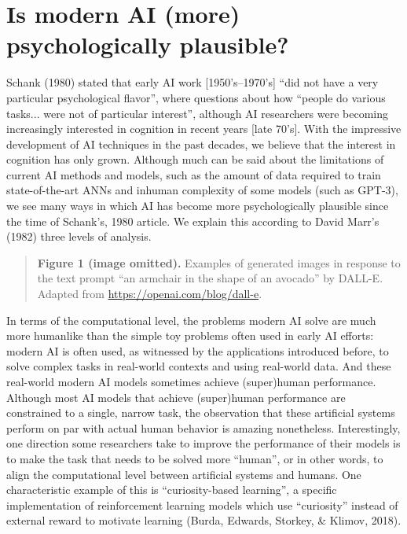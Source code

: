 \section{Is modern AI (more) psychologically plausible?}

Schank (1980) stated that early AI work [1950's--1970's]
``did not have a very particular psychological flavor'', where
questions about how ``people do various tasks... were not of
particular interest'', although AI researchers were becoming
increasingly interested in cognition in recent years [late 70's].
With the impressive development of AI techniques in the past decades,
we believe that the interest in cognition has only grown.
Although much can be said about the limitations of current AI methods
and models, such as the amount of data required to train state-of-the-art
ANNs and inhuman complexity of some models (such as GPT-3), we see many
ways in which AI has become more psychologically plausible since the
time of Schank's, 1980 article.
We explain this according to David Marr's (1982) three levels of analysis.

\begin{quote}
\small
\textbf{Figure 1 (image omitted).}
Examples of generated images in response to the text prompt
``an armchair in the shape of an avocado'' by DALL-E.
Adapted from \url{https://openai.com/blog/dall-e}.
\end{quote}

In terms of the computational level, the problems modern AI solve
are much more humanlike than the simple toy problems often used
in early AI efforts: modern AI is often used, as witnessed by the
applications introduced before, to solve complex tasks in real-world
contexts and using real-world data.
And these real-world modern AI models sometimes achieve
(super)human performance.
Although most AI models that achieve (super)human performance are
constrained to a single, narrow task, the observation that these
artificial systems perform on par with actual human behavior is
amazing nonetheless.
Interestingly, one direction some researchers take to improve the
performance of their models is to make the task that needs to be
solved more ``human'', or in other words, to align the computational
level between artificial systems and humans.
One characteristic example of this is ``curiosity-based learning'',
a specific implementation of reinforcement learning models which
use ``curiosity'' instead of external reward to motivate learning
(Burda, Edwards, Storkey, \& Klimov, 2018).

